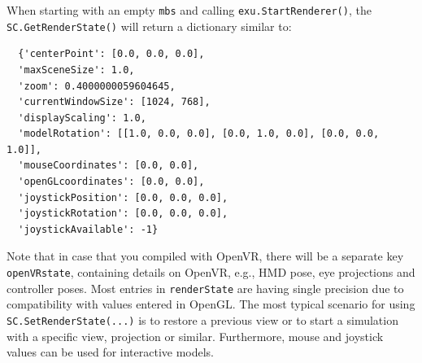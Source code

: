 When starting with an empty \texttt{mbs} and calling \texttt{exu.StartRenderer()}, the \texttt{SC.GetRenderState()} will return a dictionary similar to:
\pythonstyle\begin{lstlisting}
  {'centerPoint': [0.0, 0.0, 0.0],
  'maxSceneSize': 1.0,
  'zoom': 0.4000000059604645,
  'currentWindowSize': [1024, 768],
  'displayScaling': 1.0,
  'modelRotation': [[1.0, 0.0, 0.0], [0.0, 1.0, 0.0], [0.0, 0.0, 1.0]],
  'mouseCoordinates': [0.0, 0.0],
  'openGLcoordinates': [0.0, 0.0],
  'joystickPosition': [0.0, 0.0, 0.0],
  'joystickRotation': [0.0, 0.0, 0.0],
  'joystickAvailable': -1}
\end{lstlisting}
Note that in case that you compiled with OpenVR, there will be a separate key \texttt{openVRstate}, containing details on OpenVR, e.g., HMD pose, eye projections and controller poses.
Most entries in \texttt{renderState} are having single precision due to compatibility with values entered in OpenGL.
The most typical scenario for using \texttt{SC.SetRenderState(...)} is to restore a previous view or to start a simulation with a specific view, projection or similar. Furthermore, mouse and joystick values can be used for interactive models.

